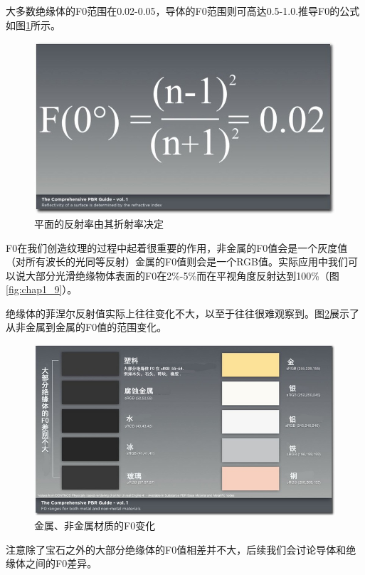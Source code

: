 大多数绝缘体的F0范围在0.02-0.05，导体的F0范围则可高达0.5-1.0.推导F0的公式如图\ref{fig:chap1_10}所示。

\begin{figure}[ht]
    \centering
	\includegraphics[width=\textwidth]{images/chap1_10.jpg}
	\caption{平面的反射率由其折射率决定}
    \label{fig:chap1_10}
\end{figure}

F0在我们创造纹理的过程中起着很重要的作用，非金属的F0值会是一个灰度值（对所有波长的光同等反射）金属的F0值则会是一个RGB值。实际应用中我们可以说大部分光滑绝缘物体表面的F0在2\%-5\%而在平视角度反射达到100\%（图\ref{fig:chap1_9}）。

绝缘体的菲涅尔反射值实际上往往变化不大，以至于往往很难观察到。图\ref{fig:chap1_11}展示了从非金属到金属的F0值的范围变化。

\begin{figure}[ht]
    \centering
	\includegraphics[width=\textwidth]{images/chap1_11.jpg}
	\caption{金属、非金属材质的F0变化}
    \label{fig:chap1_11}
\end{figure}

注意除了宝石之外的大部分绝缘体的F0值相差并不大，后续我们会讨论导体和绝缘体之间的F0差异。

